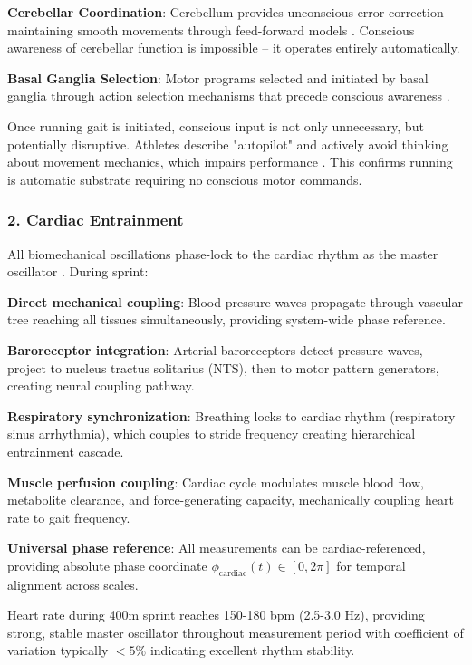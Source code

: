 \documentclass[11pt,onecolumn]{article}
\begin{document}
\textbf{Cerebellar Coordination}: Cerebellum provides unconscious error correction maintaining smooth movements through feed-forward models \citep{wolpert2011computational}. Conscious awareness of cerebellar function is impossible -- it operates entirely automatically.

\textbf{Basal Ganglia Selection}: Motor programs selected and initiated by basal ganglia through action selection mechanisms that precede conscious awareness \citep{cisek2010neural}.

Once running gait is initiated, conscious input is not only unnecessary, but potentially disruptive. Athletes describe "autopilot" and actively avoid thinking about movement mechanics, which impairs performance \citep{beilock2002behavioral}. This confirms running is automatic substrate requiring no conscious motor commands.

\subsubsection{2. Cardiac Entrainment}

All biomechanical oscillations phase-lock to the cardiac rhythm as the master oscillator \citep{sachikonye2024cardiac}. During sprint:

\textbf{Direct mechanical coupling}: Blood pressure waves propagate through vascular tree reaching all tissues simultaneously, providing system-wide phase reference.

\textbf{Baroreceptor integration}: Arterial baroreceptors detect pressure waves, project to nucleus tractus solitarius (NTS), then to motor pattern generators, creating neural coupling pathway.

\textbf{Respiratory synchronization}: Breathing locks to cardiac rhythm (respiratory sinus arrhythmia), which couples to stride frequency creating hierarchical entrainment cascade.

\textbf{Muscle perfusion coupling}: Cardiac cycle modulates muscle blood flow, metabolite clearance, and force-generating capacity, mechanically coupling heart rate to gait frequency.

\textbf{Universal phase reference}: All measurements can be cardiac-referenced, providing absolute phase coordinate $\phi_{\text{cardiac}}(t) \in [0, 2\pi]$ for temporal alignment across scales.

Heart rate during 400m sprint reaches 150-180 bpm (2.5-3.0 Hz), providing strong, stable master oscillator throughout measurement period with coefficient of variation typically $< 5\%$ indicating excellent rhythm stability.
\end{document}
